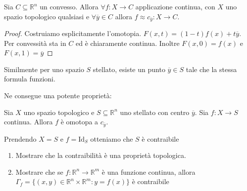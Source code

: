 \begin{proposition}
    Sia \(C \subseteq \mathbb{R}^{n} \) un convesso. Allora \(\forall f : X \to
    C\) applicazione continua, con \(X\) uno spazio topologico qualsiasi e
    \(\forall \overline{y} \in C\) allora \(f \approx c_{\overline{y}}  : X \to
    C\). 
\end{proposition}
\begin{proof}
    Costruiamo esplicitamente l'omotopia. 
    \(F{(x, t)} = {(1-t)}f{(x)} + t\overline{y}\). Per convessità sta in \(C\)
    ed è chiaramente continua. Inoltre \(F{(x, 0)} = f{(x)}\) e \(F{(x, 1)} =
    \overline{y}\) 
\end{proof}
Similmente per uno spazio \(S\) stellato, esiste un punto \(\overline{y} \in S\)
tale che la stessa formula funzioni.

Ne consegue una potente proprietà:
\begin{lemma}
    Sia \(X\) uno spazio topologico e \(S \subseteq \mathbb{R}^{n} \) uno
    stellato con centro \(\overline{y}\). Sia \(f : X \to S\) continua. Allora
    \(f\) è omotopa a \(c_{\overline{y}} \).
\end{lemma}
\begin{corollary}
    Prendendo \(X = S\) e \(f = \mathrm{Id}_S\) otteniamo che \(S\) è
    contraibile
\end{corollary}

\begin{eser}[\(\star\)]
\begin{enumerate}[label = \arabic*.]
    \item Mostrare che la contraibilità è una proprietà topologica.
    \item Mostrare che se \(f: \mathbb{R}^{n} \to \mathbb{R}^{m}\) è una funzione
    continua, allora \(\Gamma_f = \{{(x, y)} \in \mathbb{R}^{n}\times
    \mathbb{R}^{m}: y = f{(x)}\}  \) è contraibile
\end{enumerate}
\end{eser}

